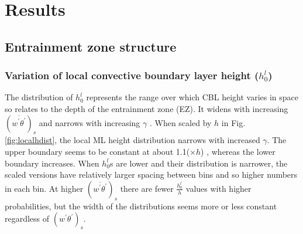 \documentclass[referee]{svjour3}
\begin{document}
\section{Results}
\subsection{Entrainment zone structure}

\subsubsection{Variation of local convective boundary layer height ($h_{0}^{l}$)}
\label{subsubsec:loccblh}


The distribution of $h_{0}^{l}$ represents the range over which CBL height varies in space so relates to the depth of the entrainment zone (EZ).  It widens with increasing $(\overline{w^{'}\theta^{'}})_{s}$ and narrows with increasing $\gamma$ \citep{Nchap14}.  When scaled by $h$ in Fig. \ref{fig:localhdist}, the local ML height distribution narrows with increased $\gamma$.  The upper boundary seems to be constant at about 1.1($\times h$) , whereas the lower boundary increases.  When $h_{0}^{l}$s are lower and their distribution is narrower, the scaled versions have relatively larger spacing between bins and so higher numbers in each bin. At higher $(\overline{w^{'}\theta^{'}})_{s}$ there are fewer $\frac{h_{0}^{l}}{h}$ values with higher probabilities, but the width of the distributions seems more or less constant regardless of $(w^{'}\theta^{'})_{s}$.\\
\end{document}
